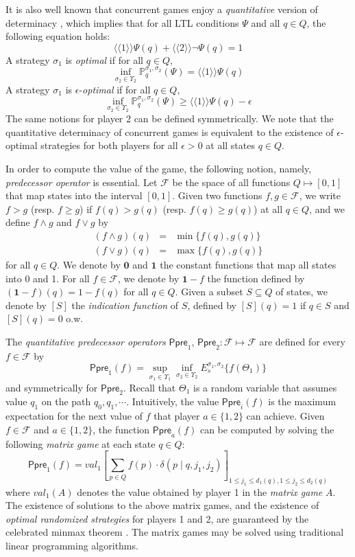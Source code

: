 \documentclass[times, 10 pt,twocolumn]{article}
\newcommand{\mc}[1]{\mathcal{#1}}
\newcommand{\lla}{\langle\langle}
\newcommand{\rra}{\rangle\rangle}
\newcommand{\Ppre}{\textsf{Ppre}}
\begin{document}
It is also well known that concurrent games enjoy a
\emph{quantitative} version of determinacy \cite{Mar98}, which
implies that for all LTL conditions $\Psi$ and all $q\in Q$, the
following equation holds:
\[\lla 1\rra\Psi(q) + \lla 2\rra\neg \Psi(q) =1 \]
%
A strategy $\sigma_1$ is \emph{optimal} if for all $q\in Q$,
\[\inf_{\sigma_2\in \Upsilon_2}\mathbb{P}_q^{\sigma_1, \sigma_{2}}(\Psi)= \lla 1\rra\Psi(q) \]
A strategy $\sigma_1$ is $\epsilon$-\emph{optimal} if for all
$q\in Q$,
\[\inf_{\sigma_2\in \Upsilon_2}\mathbb{P}_q^{\sigma_1, \sigma_{2}}(\Psi)\geq \lla 1\rra\Psi(q)-\epsilon \]
The same notions for player 2 can be defined symmetrically. We
note that the quantitative determinacy of concurrent games is
equivalent to the existence of $\epsilon$-optimal strategies for
both players for all $\epsilon>0$ at all states $q\in Q$.

\vspace{2mm}

In order to compute the value of the game, the following notion,
namely, \emph{predecessor operator} is essential. Let $\mc{F}$ be
the space of all functions $Q\mapsto [0,1]$ that map states into
the interval $[0,1]$. Given two functions $f,g\in \mc{F}$, we
write $f>g$ (resp. $f\geq g$) if $f(q)>g(q)$ (resp. $f(q)\geq
g(q)$) at all $q\in Q$, and we define $f\wedge g$ and $f\vee g$ by
\begin{eqnarray*}
  (f\wedge g)(q) &=& \min \{f(q), g(q)\}\\
  (f\vee g)(q)   &=& \max \{f(q), g(q)\}
\end{eqnarray*}
for all $q\in Q$. We denote by $\textbf{0}$ and $\textbf{1}$ the
constant functions that map all states into 0 and 1. For all $f\in
\mc{F}$, we denote by $\textbf{1}-f$ the function defined by
$(\textbf{1}-f)(q)=1-f(q)$ for all $q\in Q$. Given a subset
$S\subseteq Q$ of states, we denote by $[S]$ the \emph{indication
function} of $S$, defined by $[S](q)=1$ if $q\in S$ and $[S](q)=0$
o.w.

\vspace{2mm}

The \emph{quantitative predecessor operators} $\Ppre_1$, $\Ppre_2:
\mc{F}\mapsto \mc{F}$ are defined for every $f\in \mc{F}$ by
\[
\Ppre_1(f)=\sup_{\sigma_1\in \Upsilon_1}\inf_{\sigma_2\in
\Upsilon_2}E_s^{\sigma_1, \sigma_2}\{f(\Theta_1)\}
\]
and symmetrically for $\Ppre_2$. Recall that %
$\Theta_1$ is a random variable that assumes value $q_1$ on the
path $q_0, q_1,\cdots$. Intuitively, the value $\Ppre_i(f)$ is the
maximum expectation for the next value of $f$ that player $a\in
\{1,2\}$ can achieve. Given $f\in \mc{F}$ and $a\in \{1,2\}$, the
function $\Ppre_a(f)$ can be computed by solving the following
\emph{matrix game} at each state $q\in Q$:
\[
\Ppre_1(f)=val_1[\sum_{p\in Q}f(p)\cdot \delta(p\mid q, j_1,
j_2)]_{1\leq j_1\leq d_1(q), 1\leq j_2\leq d_2(q) }
\]
where $val_1(A)$ denotes the value obtained by player 1 in the
\emph{matrix game} $A$. The existence of solutions to the above
matrix games, and the existence of \emph{optimal randomized
strategies} for players 1 and 2, are guaranteed by the celebrated
minmax theorem \cite{vNM47}. The matrix games may be solved using
traditional linear programming algorithms.
\end{document}
